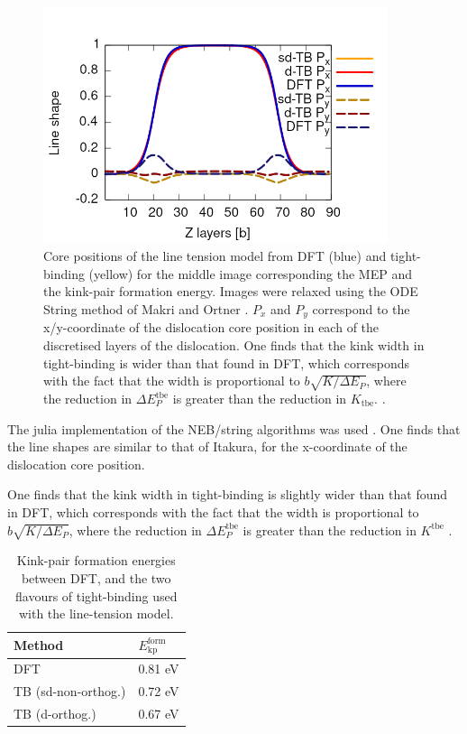 \documentclass[a4paper,11pt]{article}
\begin{document}
\begin{figure}[htbp]

\includegraphics[width=0.9\textwidth]{Images/lineshape-all_correct_gradient.png}
\caption{Core positions of the line tension model from DFT (blue) and tight-binding (yellow) for the middle image corresponding the MEP and the kink-pair formation energy. Images were relaxed using the ODE String method of Makri and Ortner \cite{Makri2019}. \(P_x\) and \(P_y\) correspond to the x/y-coordinate of the dislocation core position in each of the discretised layers of the dislocation. One finds that the kink width in tight-binding is wider than that found in DFT, which corresponds with the fact that the width is proportional to \(b\sqrt{K/\Delta E_P}\), where the reduction in \(\Delta E_P^{\text{tbe}}\) is greater than the reduction in \(K_{\text{tbe}}\).   \label{lineshape}.}
\end{figure}

The julia implementation of the NEB/string algorithms was used \cite{Makri2019}. One
finds that the line shapes are similar to that of Itakura, for the x-coordinate of the
dislocation core position.  

One finds that the kink width in tight-binding is slightly wider than that found in DFT, which
corresponds with the fact that the width is proportional to \(b\sqrt{K/\Delta E_P}\), where the
reduction in \(\Delta E_P^{\text{tbe}}\) is greater than the reduction in \(K^{\text{tbe}}\) \cite{Itakura2012}. 

\begin{table}[htbp]
\caption{Kink-pair formation energies between DFT, and the two flavours of tight-binding used with the line-tension model.}
\centering
\begin{tabular}{ll}
Method & \(E_{\text{kp}}^{\text{form}}\)\\
\hline
DFT & 0.81 eV\\
TB (sd-non-orthog.) & 0.72 eV\\
TB (d-orthog.) & 0.67 eV\\
\end{tabular}
\end{table}
\end{document}

